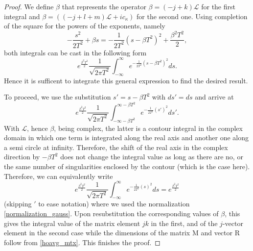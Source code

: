 \documentclass[a4,12pt]{article}
\newcommand{\M}{\mathrm{M}}
\newcommand{\R}{\mathrm{R}}
\newcommand{\opL}{\mathcal{L}}
\begin{document}
\begin{proof}
We define $\beta$ that represents the operator $\beta = (-j +k)\opL$ for the first integral and $\beta = ((-j + l + m)\opL + i c_\kappa)$ for the second one. Using completion of the square for the powers of the exponents, namely
\begin{equation}
 -\frac{s^2}{2T^2} + \beta s =     - \frac{1}{2T^2} (s - \beta T^2)^2 + \frac{\beta^2 T^2}{2},
\end{equation}
both integrals can be cast in the following form
 \begin{equation}\label{prop_eqn1}
  e^{\frac{\beta^2T^2}{2}}\frac{1}{\sqrt{2\pi T^2}}\int_{-\infty}^\infty
  e^{- \frac{1}{2T^2} (s - \beta T^2)^2} ds.
 \end{equation}
Hence it is sufficent to integrate this general expression to find the desired result.

To proceed, we use the substitution $s' = s - \beta T^2$ with $ds' = ds$ and arrive at
 \begin{equation}\label{prop_eqn2}
  e^{\frac{\beta^2T^2}{2}}\frac{1}{\sqrt{2\pi T^2}}\int_{-\infty-\beta T^2}^{\infty-\beta T^2}
  e^{- \frac{1}{2T^2} (s')^2} ds'.
 \end{equation}
With $\opL$, hence $\beta$, being complex, the latter is a contour integral in the complex domain in which one term is integrated along the real axis and another one along a semi circle at infinity. Therefore, the shift of the real axis in the complex direction by $- \beta  T^2$
 does not change the integral value as long as there are no, or the same number of singularities
 enclosed by the contour (which is the case here).
 Therefore, we can equivalently write
\begin{equation}\label{prop_eqn3}
  e^{\frac{\beta^2T^2}{2}}\frac{1}{\sqrt{2\pi T^2}}\int_{-\infty}^{\infty}
  e^{- \frac{1}{2T^2} (s)^2} ds = e^{\frac{\beta^2T^2}{2}}
 \end{equation}
(skipping $'$ to ease notation) where we used the normalization \eqref{normalization_gauss}.
Upon resubstitution the corresponding values of $\beta$, this gives the integral value of the matrix element $jk$ in the first, and of the $j$-vector element in the second case while the dimensions of the matrix $\M$ and vector $ \R$ follow from \eqref{hoavg_mtx}. This finishes the proof.
\end{proof}
\end{document}
